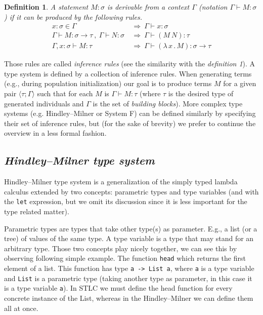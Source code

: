 \documentclass[11pt]{article}
\newtheorem{definition}{Definition}
\newcommand{\tur}[3]{#1\vdash{}#2 \colon #3}
\newcommand{\then}{\Rightarrow\xspace}
\newcommand{\lamb}[2]{( \lambda \, #1 \, . \, #2 )}
\newcommand{\ar}{\rightarrow\xspace}
\newcommand{\HM}{Hindley–Milner\xspace}
\newcommand{\ul}[2]{\langle #1 ; #2 \rangle}
\begin{document}
\begin{article}
\begin{definition}
A statement $M\colon\sigma$ is \textit{derivable from}
a context $\Gamma$ (notation 
\mbox{$\Gamma\vdash{}M\colon\sigma$}) 
if it can be produced by the following rules.
\begin{align*}
x : \sigma \in \Gamma &~\then~ \tur{\Gamma}{x}{\sigma}\\
\tur{\Gamma}{M}{\sigma \ar \tau}~,~\tur{\Gamma}{N}{\sigma} 
&~\then~ \tur{\Gamma}{(M~N)}{\tau}\\  
\tur{\Gamma,x:\sigma}{M}{\tau}
&~\then~ \tur{\Gamma}{\lamb{x}{M}}{\sigma \ar \tau} 
\end{align*}
\end{definition}

Those rules are called \textit{inference rules} (see the similarity with the \textit{definition 1}). A type system is defined by a collection of inference rules. When generating terms (e.g., during population initialization) our goal is to produce terms $M$ for a given pair $\ul{\tau}{\Gamma}$ such that for each $M$ is $\tur{\Gamma}{M}{\tau}$ (where $\tau$ is the desired type of generated individuals and $\Gamma$ is the set of \textit{building blocks}). 
More complex type systems (e.g. \HM or System F) can be defined similarly by specifying their set of inference rules, but (for the sake of brevity) we prefer to continue the overview in a less formal fashion.


\subsection{\textit{\HM type system}}

\HM type system \citep{hindley1969principal} is a generalization of the simply typed lambda calculus extended by two concepts: parametric types and type variables (and with the \texttt{let} expression, but we omit its discussion since it is less important for the type related matter).

Parametric types are types that take other type(s) as parameter. E.g., a list (or a tree) of values of the same type. 
A type variable is a type that may stand for an arbitrary type. 
Those two concepts play nicely together, we can see this by observing following simple example. The function \texttt{head} which returns the first element of a list. This function has type \texttt{a -> List a}, where \texttt{a} is a type variable and \texttt{List} is a parametric type (taking another type as parameter, in this case it is a type variable \texttt{a}). In STLC we must define the head function for every concrete instance of the List, whereas in the \HM we can define them all at once. 
 

\end{article}
\end{document}
